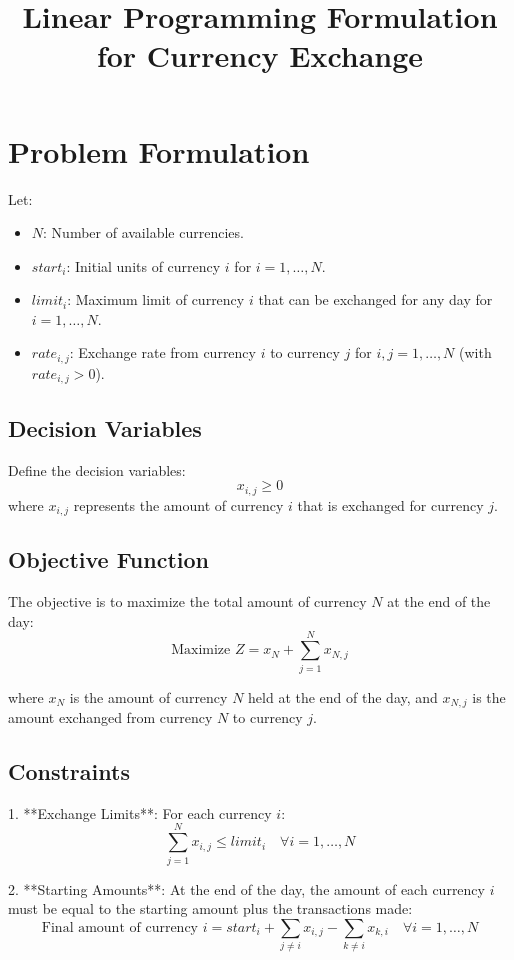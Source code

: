 \documentclass{article}
\begin{document}
\title{Linear Programming Formulation for Currency Exchange}
\author{}
\date{}
\maketitle

\section*{Problem Formulation}

Let:
\begin{itemize}
    \item \( N \): Number of available currencies.
    \item \( start_i \): Initial units of currency \( i \) for \( i = 1, \ldots, N \).
    \item \( limit_i \): Maximum limit of currency \( i \) that can be exchanged for any day for \( i = 1, \ldots, N \).
    \item \( rate_{i,j} \): Exchange rate from currency \( i \) to currency \( j \) for \( i, j = 1, \ldots, N \) (with \( rate_{i,j} > 0 \)).
\end{itemize}

\subsection*{Decision Variables}
Define the decision variables:
\[
x_{i,j} \geq 0 
\]
where \( x_{i,j} \) represents the amount of currency \( i \) that is exchanged for currency \( j \).

\subsection*{Objective Function}
The objective is to maximize the total amount of currency \( N \) at the end of the day:
\[
\text{Maximize } Z = x_{N} + \sum_{j=1}^{N} x_{N,j}
\]

where \( x_{N} \) is the amount of currency \( N \) held at the end of the day, and \( x_{N,j} \) is the amount exchanged from currency \( N \) to currency \( j \).

\subsection*{Constraints}
1. **Exchange Limits**:
   For each currency \( i \):
   \[
   \sum_{j=1}^{N} x_{i,j} \leq limit_i \quad \forall i = 1, \ldots, N
   \]

2. **Starting Amounts**:
   At the end of the day, the amount of each currency \( i \) must be equal to the starting amount plus the transactions made:
   \[
   \text{Final amount of currency } i = start_i + \sum_{j \neq i} x_{i,j} - \sum_{k \neq i} x_{k,i} \quad \forall i = 1, \ldots, N
   \]
\end{document}
